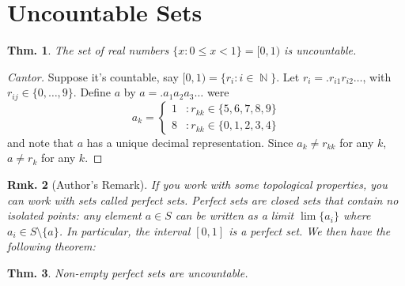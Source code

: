 \documentclass[12pt, a4paper]{book}
\DeclareMathOperator{\N}{\mathbb{N}}
\newtheorem{theorem}{Thm.}[section]
\newtheorem{remark}[theorem]{Rmk.}
\theoremstyle{nonumberplain}
\newtheorem{proof}{Proof}
\begin{document}
\section{Uncountable Sets}
\begin{theorem}
    The set of real numbers $\{x:0\leq x<1\}=[0,1)$ is uncountable.
\end{theorem}
\begin{proof}[Cantor]
    Suppose it's countable, say $[0,1)=\{r_i:i\in\N\}$. Let $r_i=.r_{i1}r_{i2}\ldots$, with $r_{ij}\in\{0,\ldots,9\}$.
    Define $a$ by $a=.a_1a_2a_3\ldots$ were
    \[a_k=
    \begin{cases}
        1 &: r_{kk}\in\{5,6,7,8,9\}\\
        8 &: r_{kk}\in\{0,1,2,3,4\}
    \end{cases}
    \]
    and note that $a$ has a unique decimal representation. Since $a_k\neq r_{kk}$ for any $k$, $a\neq r_k$ for any $k$.
\end{proof}
\begin{remark}[Author's Remark]
    If you work with some topological properties, you can work with sets called \textit{perfect sets}. Perfect sets
    are closed sets that contain no isolated points: any element $a\in S$ can be written as a limit $\lim\{a_i\}$
    where $a_i\in S\setminus\{a\}$. In particular, the interval $[0,1]$ is a perfect set. We then have the following
    theorem:
\end{remark}
\begin{theorem}
    Non-empty perfect sets are uncountable.
\end{theorem}
\end{document}
